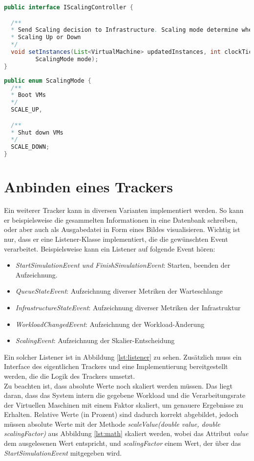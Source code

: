 \begin{lstlisting}[language=Java,firstnumber=1, caption={IScalingController.java}, label=lst:controller]
public interface IScalingController {

  /**
  * Send Scaling decision to Infrastructure. Scaling mode determine whether
  * Scaling Up or Down
  */
  void setInstances(List<VirtualMachine> updatedInstances, int clockTickCount, double intervallDuratioInMilliSeconds,
         ScalingMode mode);
}

\end{lstlisting}


\begin{lstlisting}[language=Java,firstnumber=1, caption={ScalingMode.java}, label=lst:mode]
public enum ScalingMode {
  /**
  * Boot VMs 
  */
  SCALE_UP,

  /**
  * Shut down VMs
  */
  SCALE_DOWN;
}

\end{lstlisting}




\section{Anbinden eines Trackers}
Ein weiterer Tracker kann in diversen Varianten implementiert werden. So kann er beispielsweise die gesammelten Informationen in eine Datenbank schreiben, oder aber auch als Ausgabedatei in Form eines Bildes visualisieren. Wichtig ist nur, dass er eine Listener-Klasse implementiert, die die gewünschten Event verarbeitet. Beispielsweise kann ein Listener auf folgende Event hören:

\begin{itemize}
	\item \textit{StartSimulationEvent und FinishSimulationEvent}: Starten, beenden der Aufzeichnung.
	\item \textit{QueueStateEvent}: Aufzeichnung diverser Metriken der Warteschlange
	\item \textit{InfrastructureStateEvent}: Aufzeichnung diverser Metriken der Infrastruktur
	\item \textit{WorkloadChangedEvent}: Aufzeichnung der Workload-Änderung
	\item \textit{ScalingEvent}: Aufzeichnung der Skalier-Entscheidung
\end{itemize}
\noindent
Ein solcher Listener ist in Abbildung \ref{lst:listener} zu sehen. Zusätzlich muss ein Interface des eigentlichen Trackers und eine Implementierung bereitgestellt werden, die die Logik des Trackers umsetzt. \\
Zu beachten ist, dass absolute Werte noch skaliert werden müssen. Das liegt daran, dass das System intern die gegebene Workload und die Verarbeitungsrate der Virtuellen Maschinen mit einem Faktor skaliert, um genauere Ergebnisse zu Erhalten. Relative Werte (in Prozent) sind dadurch korrekt abgebildet, jedoch müssen absolute Werte mit der Methode \textit{scaleValue(double value, double scalingFactor)} aus Abbildung \ref{lst:math} skaliert werden, wobei das Attribut \textit{value} dem ausgelesenen Wert entspricht, und \textit{scalingFactor} einem Wert, der über das \textit{StartSimulationEvent} mitgegeben wird.\\

